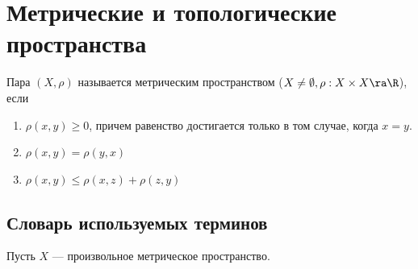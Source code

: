 
\section{Метрические и топологические пространства}

\begin{definition}
    Пара \((X, \rho)\) называется метрическим пространством (\(X \ne \emptyset, \rho: X \times X \ra \R\)), если
    \begin{enumerate}
        \item \(\rho(x, y) \ge 0\), причем равенство достигается только в том случае, когда \(x = y\).
        \item \(\rho(x, y) = \rho(y, x)\)
        \item \(\rho(x, y) \le \rho(x, z) + \rho(z, y)\)
    \end{enumerate}
\end{definition}

\subsection{Словарь используемых терминов}

Пусть \(X\) --- произвольное метрическое пространство.

